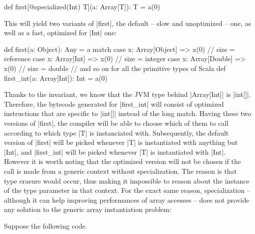 
\begin{lstlisting-nobreak}
 def first[@specialized(Int) T](a: Array[T]): T = a(0)
\end{lstlisting-nobreak}

This will yield two variants of |first|, the default -- slow and unoptimized -- one, as well as a fast, optimized for |Int| one:

\begin{lstlisting-nobreak}
 def first(a: Object): Any =
   a match {
     case x: Array[Object] => x(0) // size = reference
     case x: Array[Int]    => x(0) // size = integer
     case x: Array[Double] => x(0) // size = double
     // and so on for all the primitive types of Scala
   }
 def first_int(a: Array[Int]): Int = a(0)
\end{lstlisting-nobreak}


Thanks to the invariant, we know that the JVM type behind |Array[Int]| is |int[]|. Therefore, the bytecode generated for |first_int| will consist of optimized instructions that are specific to |int[]| instead of the long match. Having these two versions of |first|, the compiler will be able to choose which of them to call according to which type |T| is instanciated with. Subsequently, the default version of |first| will be picked whenever |T| is instantiated with anything but |Int|, and |first_int| will be picked whenever |T| is instantiated with |Int|. However it is worth noting that the optimized version will not be chosen if the call is made from a generic context without specialization. The reason is that type erasure would occur, thus making it impossible to reason about the instance of the type parameter in that context. For the exact same reason, specialization -- although it can help improving performances of array accesses -- does not provide any solution to the generic array instantiation problem:

Suppose the following code.

